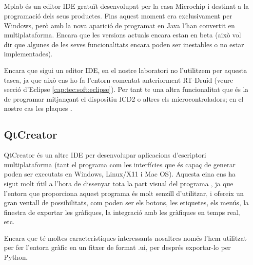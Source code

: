 \subsection{\MplabX}\label{cap:tec:soft:mplab}


Mplab és un editor IDE gratuït desenvolupat per la casa Microchip i destinat a la programació dels seus productes. Fins aquest moment era exclusivament per Windows, però amb la nova aparició de \MplabX programat en Java l'han convertit en multiplataforma. Encara que les versions actuals encara estan en beta (això vol dir que algunes de les seves funcionalitats encara poden ser inestables o no estar implementades).


Encara que sigui un editor IDE, en el nostre laboratori no l'utilitzem per aquesta tasca, ja que això ens ho fa l'entorn comentat anteriorment RT-Druid (veure secció d'Eclipse \ref{cap:tec:soft:eclipse}). Per tant te una altra funcionalitat que és la de programar mitjançant el dispositiu ICD2 o altres els microcontroladors; en el nostre cas les plaques \FLEX.


\subsection{QtCreator}\label{cap:tec:soft:qtcreator}


QtCreator és un altre IDE per desenvolupar aplicacions d'escriptori multiplataforma (tant el programa com les interfícies que és capaç de generar poden ser executats en Windows, Linux/X11 i Mac OS). Aquesta eina ens ha sigut molt útil a l'hora de dissenyar tota la part visual del programa \DCSMonitor, ja que l'entorn que proporciona aquest programa és molt senzill d'utilitzar, i ofereix un gran ventall de possibilitats, com poden ser els botons, les etiquetes, els menús, la finestra de exportar les gràfiques, la integració amb les gràfiques en temps real, etc.

Encara que té moltes característiques interessants nosaltres només l'hem utilitzat per fer l'entorn gràfic en un fitxer de format .ui, per després exportar-lo per Python.

